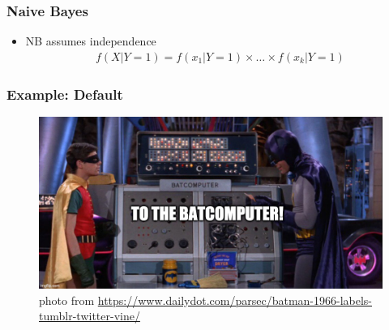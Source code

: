 \documentclass[
  shownotes,
  xcolor={svgnames},
  hyperref={colorlinks,citecolor=DarkBlue,linkcolor=andesred,urlcolor=DarkBlue}
  , aspectratio=169]{beamer}
\begin{document}
\begin{frame}[fragile]
\frametitle{ Naive Bayes}
\begin{itemize}
  \item NB assumes independence
\begin{align}
  f(X|Y=1)=f(x_1|Y=1) \times \dots   \times f(x_k|Y=1)
\end{align}
  
\end{itemize}
\end{frame}
\begin{frame}[fragile]
\frametitle{Example: Default}
\begin{figure}[H] \centering
  \centering
  \includegraphics[scale=0.35]{figures/baticomputer_meme.jpg}
  \\
  \tiny photo from \url{https://www.dailydot.com/parsec/batman-1966-labels-tumblr-twitter-vine/}
\end{figure}

 \end{frame}


\end{document}

